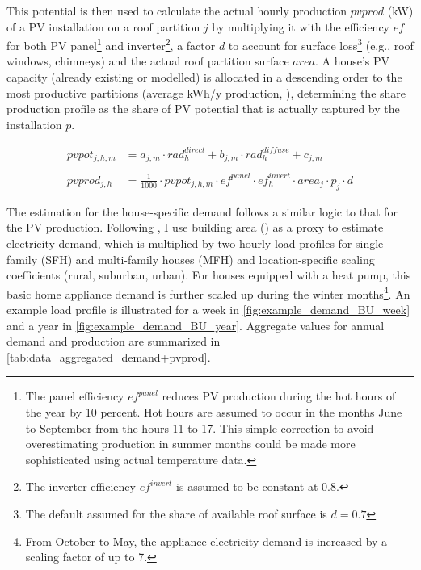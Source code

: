 \documentclass[12PT, ]{article}
\begin{document}
This potential is then used to calculate the actual hourly production $pvprod$ (kW) of a PV installation on a roof partition $j$ by multiplying it with the efficiency $ef$ for both PV panel\footnote{The panel efficiency $ef^{panel}$ reduces PV production during the hot hours of the year by 10 percent. Hot hours are assumed to occur in the months June to September from the hours 11 to 17. This simple correction to avoid overestimating production in summer months could be made more sophisticated using actual temperature data.} 
and inverter\footnote{The inverter efficiency $ef^{invert}$ is assumed to be constant at 0.8.}, a factor $d$ to account for surface loss\footnote{The default assumed for the share of available roof surface is $d=0.7$} 
(e.g., roof windows, chimneys) and the actual roof partition surface $area$. 
A house's PV capacity (already existing or modelled) is allocated in a descending order to the most productive partitions (average kWh/y production, \cite{solkat2023}), determining the share production profile as the share of PV potential that is actually captured by the installation $p$.

\vspace{0.1cm}
\begin{equation}
    \begin{aligned}
    pvpot_{j,h,m} &= a_{j,m} \cdot rad_h^{direct} + b_{j,m} \cdot rad_h^{diffuse} + c_{j,m}\\
    \\
    pvprod_{j,h} & = \frac{1}{1000} \cdot pvpot_{j,h,m} \cdot ef^{panel} \cdot ef^{invert}_{h} \cdot area_j \cdot p_{j} \cdot d   
    \end{aligned}
\label{equ:pvprod_calc}
\end{equation}
\vspace{0.05cm}

The estimation for the house-specific demand follows a similar logic to that for the PV production. Following \cite{swissstore2022}, I use building area (\cite{gwr2025}) as a proxy to estimate electricity demand, which is multiplied by two hourly load profiles for single-family (SFH) and multi-family houses (MFH) and location-specific scaling coefficients (rural, suburban, urban). 
For houses equipped with a heat pump, this basic home appliance demand is further scaled up during the winter months\footnote{From October to May, the appliance electricity demand is increased by a scaling factor of up to 7.}. An example load profile is illustrated for a week in \ref{fig:example_demand_BU_week} and a year in \ref{fig:example_demand_BU_year}. Aggregate values for annual demand and production are summarized in \ref{tab:data_aggregated_demand+pvprod}.
\end{document}

